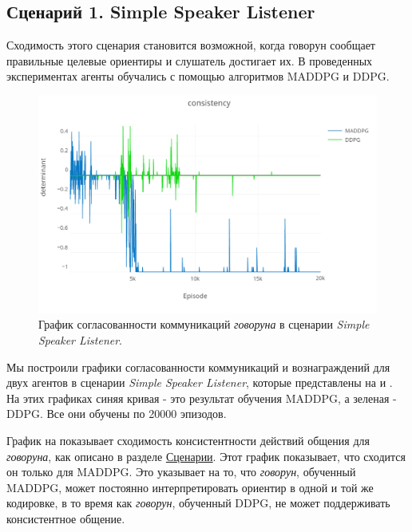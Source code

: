 \subsection{Сценарий 1. Simple Speaker Listener}

Сходимость этого сценария становится возможной, когда говорун сообщает правильные целевые ориентиры и слушатель достигает их. В проведенных экспериментах агенты обучались с помощью алгоритмов MADDPG и DDPG.

\begin{figure}[ht!]
    \center
    \includegraphics [scale=0.38] {my_folder/images/ch5/ssl-comm.png}
    \caption{График согласованности коммуникаций \textit{говоруна} в сценарии \textit{Simple Speaker Listener}.}
    \label{fig:result-ssl-comm}
\end{figure}

Мы построили графики согласованности коммуникаций и вознаграждений для двух агентов в сценарии \textit{Simple Speaker Listener}, которые представлены на  и . На этих графиках синяя кривая - это результат обучения MADDPG, а зеленая - DDPG. Все они обучены по 20000 эпизодов.

График на  показывает сходимость консистентности действий общения для \textit{говоруна}, как описано в разделе \hyperref[exp-ssl]{Сценарии}. Этот график показывает, что сходится он только для MADDPG. Это указывает на то, что \textit{говорун}, обученный MADDPG, может постоянно интерпретировать ориентир в одной и той же кодировке, в то время как \textit{говорун}, обученный DDPG, не может поддерживать консистентное общение.

